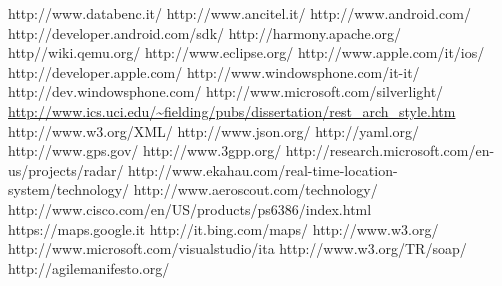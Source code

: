 
\begin{thesitography}{9}
 http://www.databenc.it/
 http://www.ancitel.it/
 http://www.android.com/
 http://developer.android.com/sdk/
 http://harmony.apache.org/
 http//wiki.qemu.org/
 http://www.eclipse.org/
 http://www.apple.com/it/ios/
 http://developer.apple.com/
 http://www.windowsphone.com/it-it/
 http://dev.windowsphone.com/
 http://www.microsoft.com/silverlight/
 \url{http://www.ics.uci.edu/~fielding/pubs/dissertation/rest_arch_style.htm}
 http://www.w3.org/XML/
 http://www.json.org/
 http://yaml.org/
 http://www.gps.gov/
 http://www.3gpp.org/
 http://research.microsoft.com/en-us/projects/radar/
 http://www.ekahau.com/real-time-location-system/technology/
 http://www.aeroscout.com/technology/
 http://www.cisco.com/en/US/products/ps6386/index.html
 https://maps.google.it
 http://it.bing.com/maps/
 http://www.w3.org/
 http://www.microsoft.com/visualstudio/ita
 http://www.w3.org/TR/soap/
 http://agilemanifesto.org/
\end{thesitography}

\clearpage{\pagestyle{empty}\cleardoublepage}
